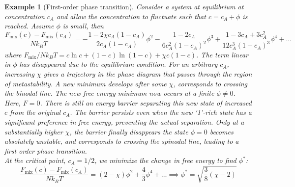 \documentclass[a4paper]{article}
\newtheorem{eg}{Example}[section]
\theoremstyle{new}
\begin{document}
\begin{eg}[First-order phase transition]
Consider a system at equilibrium at concentration $c_A$ and allow the concentration to fluctuate such that $c=c_A+\phi$ is reached. Assume $\phi$ is small, then
$$\frac{F_{\text{mix}}(c)-F_{\text{mix}}(c_A)}{Nk_BT}=-\frac{1-2\chi c_A(1-c_A)}{2c_A(1-c_A)}\phi^2-\frac{1-2c_A}{6c_A^2(1-c_A)^2}\phi^3+\frac{1-3c_A+3c_A^2}{12c_A^3(1-c_A)^3}\phi^4+\dots$$
where $F_{\text{mix}}/Nk_BT=c\ln c+(1-c)\ln(1-c)+\chi c(1-c)$. The term linear in $\phi$ has disappeared due to the equilibrium condition. For an arbitrary $c_A$, increasing $\chi$ gives a trajectory in the phase diagram that passes through the region of metastability. A new minimum develops after some $\chi$, corresponds to crossing the binodal line. The new free energy minimum now occurs at a finite $\phi\neq 0$. Here, $F=0$. There is still an energy barrier separating this new state of increased $c$ from the original $c_A$. The barrier persists even when the new `1'-rich state has a significant preference in free energy, preventing the actual separation. Only at a substantially higher $\chi$, the barrier finally disappears the state $\phi=0$ becomes absolutely unstable, and corresponds to crossing the spinodal line, leading to a first order phase transition.\\[5pt]
At the critical point, $c_A=1/2$, we minimize the change in free energy to find $\phi^*$:
$$\frac{F_{\text{mix}}(c)-F_{\text{mix}}(c_A)}{Nk_BT}=(2-\chi)\phi^2+\frac{4}{3}\phi^4+\dots\implies\phi^*=\sqrt{\frac{3}{8}(\chi-2)}$$
\end{eg}
\end{document}
